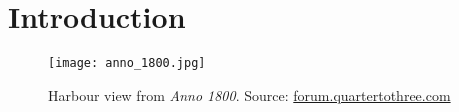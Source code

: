\section{Introduction}


\begin{figure}[h]
    \centering
    \texttt{[image: anno\_1800.jpg]}
    \caption{Harbour view from \textit{Anno 1800}. Source:
    \href{https://forum.quartertothree.com/t/anno-1800-city-building-in-the-industrial-revolution/131265/12}{\url{forum.quartertothree.com}}}\label{fig:anno}
\end{figure}
